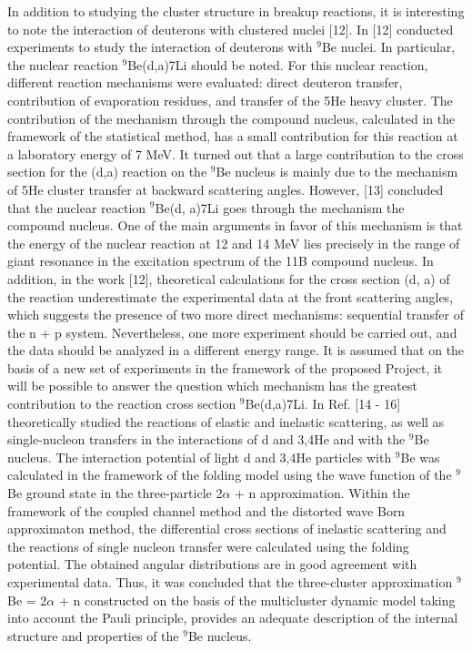 \documentclass[
12pt, %
oneside, %
english, %
onehalfspacing, %
headsepline, %
]{MastersDoctoralThesis} %
\begin{document}
In addition to studying the cluster structure in breakup reactions, it is interesting to note the interaction of deuterons with clustered nuclei [12]. In [12] conducted experiments to study the interaction of deuterons with $^{9}$Be nuclei. In particular, the nuclear reaction $^{9}$Be(d,a)7Li should be noted. For this nuclear reaction, different reaction mechanisms were evaluated: direct deuteron transfer, contribution of evaporation residues, and transfer of the 5He heavy cluster. The contribution of the mechanism through the compound nucleus, calculated in the framework of the statistical method, has a small contribution for this reaction at a laboratory energy of 7 MeV. It turned out that a large contribution to the cross section for the (d,a) reaction on the $^{9}$Be nucleus is mainly due to the mechanism of 5He cluster transfer at backward scattering angles. However, [13] concluded that the nuclear reaction $^{9}$Be(d, a)7Li goes through the mechanism the compound nucleus. One of the main arguments in favor of this mechanism is that the energy of the nuclear reaction at 12 and 14 MeV lies precisely in the range of giant resonance in the excitation spectrum of the 11B compound nucleus. In addition, in the work [12], theoretical calculations for the cross section (d, a) of the reaction underestimate the experimental data at the front scattering angles, which suggests the presence of two more direct mechanisms: sequential transfer of the n + p system. Nevertheless, one more experiment should be carried out, and the data should be analyzed in a different energy range. It is assumed that on the basis of a new set of experiments in the framework of the proposed Project, it will be possible to answer the question which mechanism has the greatest contribution to the reaction cross section $^{9}$Be(d,a)7Li.
In Ref. [14 - 16] theoretically studied the reactions of elastic and inelastic scattering, as well as single-nucleon transfers in the interactions of d and 3,4He and with the $^{9}$Be nucleus. The interaction potential of light d and 3,4He particles with $^{9}$Be was calculated in the framework of the folding model using the wave function of the $^{9}$Be ground state in the three-particle 2$\alpha$ + n approximation. Within the framework of the coupled channel method and the distorted wave Born approximaton method, the differential cross sections of inelastic scattering and the reactions of single nucleon transfer were calculated using the folding potential. The obtained angular distributions are in good agreement with experimental data. Thus, it was concluded that the three-cluster approximation $^{9}$Be = 2$\alpha$ + n constructed on the basis of the multicluster dynamic model taking into account the Pauli principle, provides an adequate description of the internal structure and properties of the $^{9}$Be nucleus.  
\end{document}
